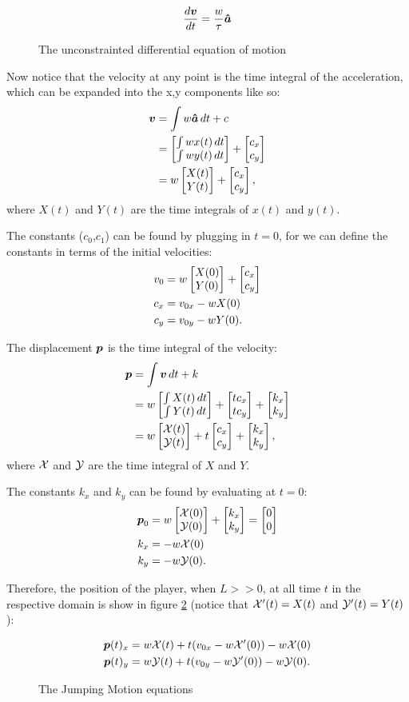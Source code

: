 \begin{figure}[H]
 \centering
 \[
    \frac{d\boldsymbol{v}}{dt} = \frac{w}{\tau} \boldsymbol{\hat{a}}
 \]
 \caption{The unconstrainted differential equation of motion}
 \label{eq:un_diff}
\end{figure}

Now notice that the velocity at any point is the time integral of the acceleration, which can be expanded into the x,y components like so:
\begin{align*}
    \boldsymbol{v} &= \int w\boldsymbol{\hat{a}} \,dt + c\\
    &= \begin{bmatrix}\int w x(t) \,dt\\ \int w y(t) \,dt \end{bmatrix} + \begin{bmatrix}c_x\\c_y \end{bmatrix}\\
    &= w\begin{bmatrix}X(t)\\Y(t) \end{bmatrix} + \begin{bmatrix}c_x\\c_y \end{bmatrix},
\end{align*}
where $X(t)$ and $Y(t)$ are the time integrals of $x(t)$ and $y(t)$.

The constants ($c_0$,$c_1$) can be found by plugging in $t=0$, for we can define the constants in terms of the initial velocities:
\begin{align*}
    v_0 &= w \begin{bmatrix}X(0)\\Y(0) \end{bmatrix} + \begin{bmatrix}c_x\\c_y \end{bmatrix}\\
    c_x &= v_{0x} -wX(0)\\
    c_y &= v_{0y} -wY(0).
\end{align*}

The displacement $\boldsymbol{p}$ is the time integral of the velocity:
\begin{align*}
    \boldsymbol{p} &= \int \boldsymbol{v} \, dt + k\\
    &= w \begin{bmatrix}\int X(t) \, dt\\\int Y(t) \, dt \end{bmatrix} + \begin{bmatrix}tc_x\\tc_y \end{bmatrix} + \begin{bmatrix}k_x\\k_y \end{bmatrix}\\
    &= w \begin{bmatrix}\mathcal{X}(t)\\\mathcal{Y}(t) \end{bmatrix}  + t\begin{bmatrix}c_x\\c_y \end{bmatrix}  + \begin{bmatrix}k_x\\k_y \end{bmatrix},
\end{align*}
where $\mathcal{X}$ and $\mathcal{Y}$ are the time integral of $X$ and $Y$.

The constants $k_x$ and $k_y$ can be found by evaluating at $t=0$:
\begin{align*}
    \boldsymbol{p}_0 &= w \begin{bmatrix}\mathcal{X}(0)\\\mathcal{Y}(0) \end{bmatrix} + \begin{bmatrix}k_x\\k_y \end{bmatrix} = \begin{bmatrix}0\\0 \end{bmatrix}\\
    k_x &= -w\mathcal{X}(0)\\
    k_y &= -w\mathcal{Y}(0).
\end{align*}

Therefore, the position of the player, when $L >> 0$, at all time $t$ in the respective domain is show in figure \ref{eq:jumping} (notice that $\mathcal{X}'(t) = X(t)$ and $\mathcal{Y}'(t) = Y(t)$):

\begin{figure}[H]
    \centering
    \begin{align*}
        \boldsymbol{p}(t)_x &= w\mathcal{X}(t) + t(v_{0x} - w\mathcal{X}'(0)) - w\mathcal{X}(0)\\
        \boldsymbol{p}(t)_y &= w\mathcal{Y}(t) + t(v_{0y} - w\mathcal{Y}'(0)) - w\mathcal{Y}(0).
    \end{align*}
    \caption{The Jumping Motion equations}
    \label{eq:jumping}
\end{figure}



